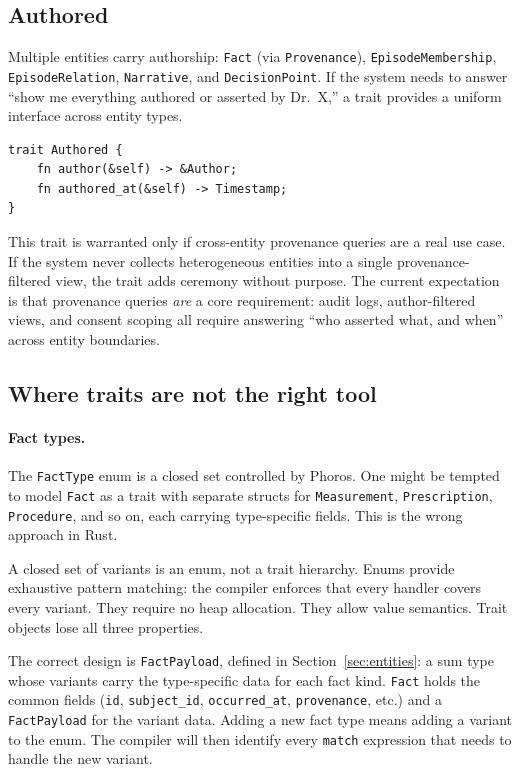 \documentclass[11pt]{article}
\begin{document}
\subsection{Authored}
\label{sec:trait-authored}

Multiple entities carry authorship: \texttt{Fact} (via \texttt{Provenance}),
\texttt{EpisodeMembership}, \texttt{EpisodeRelation}, \texttt{Narrative},
and \texttt{DecisionPoint}. If the system needs to answer ``show me
everything authored or asserted by Dr.~X,'' a trait provides a uniform
interface across entity types.

\begin{lstlisting}
trait Authored {
    fn author(&self) -> &Author;
    fn authored_at(&self) -> Timestamp;
}
\end{lstlisting}

This trait is warranted only if cross-entity provenance queries are a real
use case. If the system never collects heterogeneous entities into a single
provenance-filtered view, the trait adds ceremony without purpose. The
current expectation is that provenance queries \emph{are} a core
requirement: audit logs, author-filtered views, and consent scoping all
require answering ``who asserted what, and when'' across entity boundaries.


\subsection{Where traits are not the right tool}
\label{sec:traits-not}

\paragraph{Fact types.}
The \texttt{FactType} enum is a closed set controlled by Phoros. One might
be tempted to model \texttt{Fact} as a trait with separate structs for
\texttt{Measurement}, \texttt{Prescription}, \texttt{Procedure}, and so on,
each carrying type-specific fields. This is the wrong approach in Rust.

A closed set of variants is an enum, not a trait hierarchy. Enums provide
exhaustive pattern matching: the compiler enforces that every handler covers
every variant. They require no heap allocation. They allow value semantics.
Trait objects lose all three properties.

The correct design is \texttt{FactPayload}, defined in
Section~\ref{sec:entities}: a sum type whose variants carry the
type-specific data for each fact kind. \texttt{Fact} holds the common fields
(\texttt{id}, \texttt{subject\_id}, \texttt{occurred\_at},
\texttt{provenance}, etc.) and a \texttt{FactPayload} for the variant data.
Adding a new fact type means adding a variant to the enum. The compiler will
then identify every \texttt{match} expression that needs to handle the new
variant.
\end{document}
